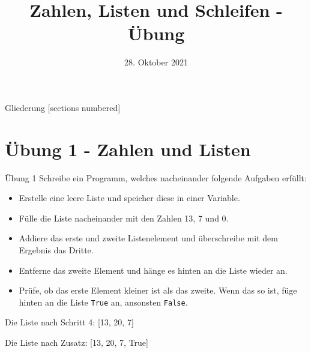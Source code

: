 



\title{Zahlen, Listen und Schleifen - Übung}
\date{28. Oktober 2021}


\maketitle

\begin{frame}{Gliederung}
	[sections numbered]
	\tableofcontents
\end{frame}


\section{Übung 1 - Zahlen und Listen}
\begin{frame}{Übung 1}
	Schreibe ein Programm, welches nacheinander folgende Aufgaben erfüllt:
	\linebreak
	
	\begin{itemize}
		\item[\textbf{1.}] Erstelle eine leere Liste und speicher diese in einer Variable.
		\item[\textbf{2.}] Fülle die Liste nacheinander mit den Zahlen 13, 7 und 0.
		\item[\textbf{3.}] Addiere das erste und zweite Listenelement und überschreibe  mit dem Ergebnis das Dritte.
		\item[\textbf{4.}] Entferne das zweite Element und hänge es hinten an die Liste wieder an.
		\item[\textbf{Zusatz}] Prüfe, ob das erste Element kleiner ist als das zweite. Wenn das so ist, füge hinten an die Liste \alert{\texttt{True}} an, ansonsten \alert{\texttt{False}}.
	\end{itemize}
	Die Liste nach Schritt 4: [13, 20, 7]
	
	Die Liste nach Zusatz: [13, 20, 7, True]
	
\end{frame}

